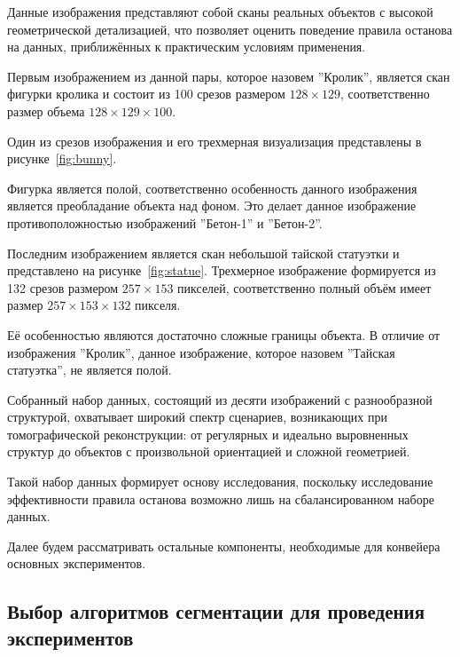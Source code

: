 Данные изображения представляют собой сканы реальных объектов с высокой геометрической детализацией, что позволяет оценить поведение правила останова на данных, приближённых к практическим условиям применения.

Первым изображением из данной пары, которое назовем ''Кролик'', является скан фигурки кролика и состоит из 100 срезов размером \(128 \times 129\), соответственно размер объема \(128 \times 129 \times 100\).

Один из срезов изображения и его трехмерная визуализация представлены в рисунке~\ref{fig:bunny}.

Фигурка является полой, соответственно особенность данного изображения является преобладание объекта над фоном. Это делает данное изображение противоположностью изображений ''Бетон-1'' и ''Бетон-2''.


Последним изображением является скан небольшой тайской статуэтки и представлено на рисунке~\ref{fig:statue}. Трехмерное изображение формируется из 132 срезов размером \(257 \times 153\) пикселей, соответственно полный объём имеет размер \(257 \times 153 \times 132\) пикселя.

Её особенностью являются достаточно сложные границы объекта. В отличие от изображения ''Кролик'', данное изображение, которое назовем ''Тайская статуэтка'', не является полой.


Собранный набор данных, состоящий из десяти изображений с разнообразной структурой, охватывает широкий спектр сценариев, возникающих при томографической реконструкции: от регулярных и идеально выровненных структур до объектов с произвольной ориентацией и сложной геометрией.

Такой набор данных формирует основу исследования, поскольку исследование эффективности правила останова возможно лишь на сбалансированном наборе данных. 

Далее будем рассматривать остальные компоненты, необходимые для конвейера основных экспериментов.

\subsection{Выбор алгоритмов сегментации для проведения экспериментов}

